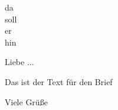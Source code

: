 \documentclass[tsbrieflco]{scrlttr2}
\begin{document}
\begin{letter}{da\\soll\\er\\hin}
\opening{Liebe ...}

Das ist der Text für den Brief

\closing{Viele Grüße}
\end{letter}
\end{document}
